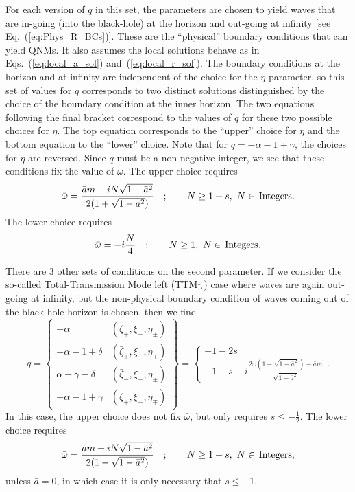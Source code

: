 \documentclass[11pt]{article}
\begin{document}
For each version of $q$ in this set, the parameters are chosen to
yield waves that are in-going (into the black-hole) at the horizon and
out-going at infinity [see Eq.~(\ref{eq:Phys_R_BCs})].  These are the
``physical'' boundary conditions that can yield QNMs.  It also assumes
the local solutions behave as in Eqs.~(\ref{eq:local_a_sol})
and~(\ref{eq:local_r_sol}).  The boundary conditions at the horizon
and at infinity are independent of the choice for the $\eta$
parameter, so this set of values for $q$ corresponds to two distinct
solutions distinguished by the choice of the boundary condition at the
inner horizon.  The two equations following the final bracket
correspond to the values of $q$ for these two possible choices for
$\eta$.  The top equation corresponds to the ``upper'' choice for
$\eta$ and the bottom equation to the ``lower'' choice.  Note that for
$q=-\alpha-1+\gamma$, the choices for $\eta$ are reversed.  Since $q$
must be a non-negative integer, we see that these conditions fix the
value of $\bar\omega$.  The upper choice requires
\begin{equation}\label{eq:PP_omega_upper}
  \bar\omega = \frac{\bar{a}m-iN\sqrt{1-\bar{a}^2}}{2(1+\sqrt{1-\bar{a}^2})}
  \quad;\qquad N\ge 1+s,\ N\in\,\rm{Integers}.
\end{equation}
The lower choice requires
\begin{equation}\label{eq:PP_omega_lower}
  \bar\omega = -i\frac{N}4 \quad;\qquad N\ge 1,\ N\in\,\rm{Integers}.
\end{equation}

There are 3 other sets of conditions on the second parameter.  If we
consider the so-called Total-Transmission Mode left (TTM${}_{\rm{L}}$)
case where waves are again out-going at infinity, but the non-physical
boundary condition of waves coming out of the black-hole horizon is
chosen, then we find
\begin{equation}\label{eq:NP_boundary_set}
  q= \left\{\begin{array}{cc}
            -\alpha & (\bar\zeta_+,\xi_+,\eta_\pm) \\
            -\alpha-1+\delta & (\bar\zeta_+,\xi_\minus,\eta_\pm) \\
            \alpha-\gamma-\delta & (\bar\zeta_\minus,\xi_+,\eta_\pm) \\
            -\alpha-1+\gamma & (\bar\zeta_+,\xi_+,\eta_\mp)
  \end{array}\right\} =\left\{\begin{array}{c}
  -1-2s \\
  -1-s-i\frac{2\bar\omega(1-\sqrt{1-\bar{a}^2})-\bar{a}m}{\sqrt{1-\bar{a}^2}}
  \end{array}\right. .
\end{equation}  
In this case, the upper choice does not fix $\bar\omega$, but only requires
$s\le-\frac12$.  The lower choice requires
\begin{equation}
  \bar\omega = \frac{\bar{a}m+iN\sqrt{1-\bar{a}^2}}{2(1-\sqrt{1-\bar{a}^2})}
  \quad;\qquad N\ge 1+s,\ N\in\,\rm{Integers},
\end{equation}
unless $\bar{a}=0$, in which case it is only necessary that $s\le-1$.
\end{document}
